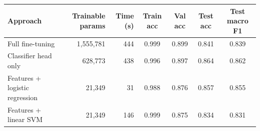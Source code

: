 \begin{tabular}{lrrcccc}
\toprule
Approach & Trainable params & Time (s) & Train acc & Val acc & Test acc & Test macro F1 \\
\midrule
Full fine-tuning & 1,555,781 & 444 & 0.999 & 0.899 & 0.841 & 0.839 \\
Classifier head only & 628,773 & 438 & 0.996 & 0.897 & 0.864 & 0.862 \\
Features + logistic regression & 21,349 & 31 & 0.988 & 0.876 & 0.857 & 0.855 \\
Features + linear SVM & 21,349 & 146 & 0.999 & 0.875 & 0.834 & 0.831 \\
\bottomrule
\end{tabular}
